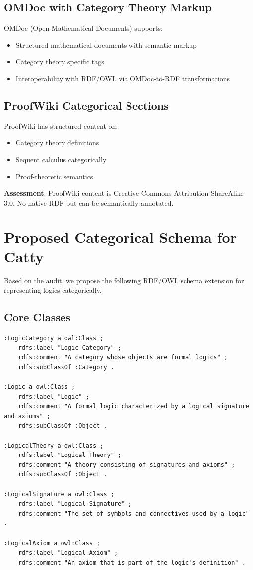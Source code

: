 \subsection{OMDoc with Category Theory Markup}

OMDoc (Open Mathematical Documents) supports:
\begin{itemize}
  \item Structured mathematical documents with semantic markup
  \item Category theory specific tags
  \item Interoperability with RDF/OWL via OMDoc-to-RDF transformations
\end{itemize}

\subsection{ProofWiki Categorical Sections}

ProofWiki has structured content on:
\begin{itemize}
  \item Category theory definitions
  \item Sequent calculus categorically
  \item Proof-theoretic semantics
\end{itemize}

\textbf{Assessment}: ProofWiki content is Creative Commons Attribution-ShareAlike 3.0. No native RDF but can be semantically annotated.

\section{Proposed Categorical Schema for Catty}

Based on the audit, we propose the following RDF/OWL schema extension for representing logics categorically.

\subsection{Core Classes}

\begin{verbatim}
:LogicCategory a owl:Class ;
    rdfs:label "Logic Category" ;
    rdfs:comment "A category whose objects are formal logics" ;
    rdfs:subClassOf :Category .

:Logic a owl:Class ;
    rdfs:label "Logic" ;
    rdfs:comment "A formal logic characterized by a logical signature and axioms" ;
    rdfs:subClassOf :Object .

:LogicalTheory a owl:Class ;
    rdfs:label "Logical Theory" ;
    rdfs:comment "A theory consisting of signatures and axioms" ;
    rdfs:subClassOf :Object .

:LogicalSignature a owl:Class ;
    rdfs:label "Logical Signature" ;
    rdfs:comment "The set of symbols and connectives used by a logic" .

:LogicalAxiom a owl:Class ;
    rdfs:label "Logical Axiom" ;
    rdfs:comment "An axiom that is part of the logic's definition" .
\end{verbatim}

